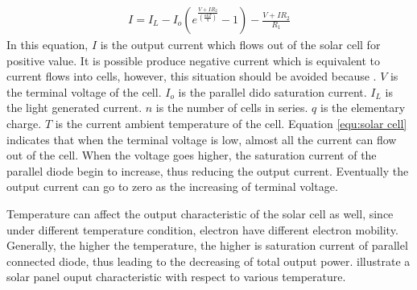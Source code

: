 \begin{eqnarray}\label{equ:solar cell}
    I = I_L - I_o(e^{\frac{V+IR_2}{(\frac{nkT}{q})}} - 1) - \frac{V+IR_2}{R_1}
\end{eqnarray}
In this equation, $I$ is the output current which flows out of the solar cell for positive value. It is possible produce negative current which is equivalent to current flows into cells, however, this situation should be avoided because .  $V$ is the terminal voltage of the cell. $I_o$ is the parallel dido saturation current. $I_L$ is the light generated current. $n$ is the number of cells in series. $q$ is the elementary charge. $T$ is the current ambient temperature of the cell. Equation \eqref{equ:solar cell} indicates that when the terminal voltage is low, almost all the current can flow out of the cell. When the voltage goes higher, the saturation current of the parallel diode begin to increase, thus reducing the output current. Eventually the output current can go to zero as the increasing of terminal voltage. 

Temperature can affect the output characteristic of the solar cell as well, since under different temperature condition, electron have different electron mobility. Generally, the higher the temperature, the higher is saturation current of parallel connected diode, thus leading to the decreasing of total output power.  illustrate a solar panel ouput characteristic with respect to various temperature. 

